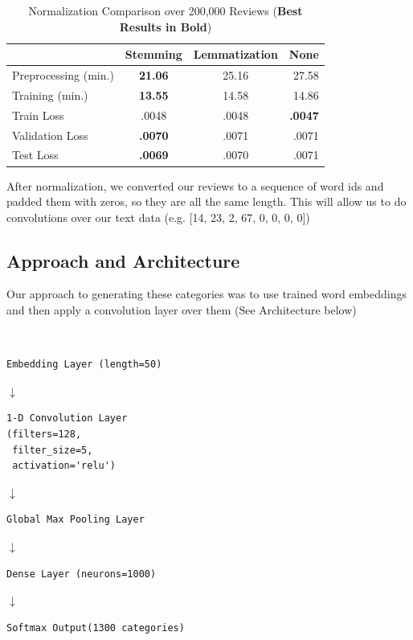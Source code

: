 \documentclass{article}
\begin{document}
\begin{table}[h!]
	\begin{center}
		\caption{Normalization Comparison over 200,000 Reviews (\textbf{Best Results in Bold})}
		\label{tab:table1}
		\begin{tabular}{l||c|c|r} %
			\textbf{} & \textbf{Stemming} & \textbf{Lemmatization} & \textbf{None}\\
			\hline
			Preprocessing (min.) & \textbf{21.06} & 25.16 & 27.58\\
			Training (min.) & \textbf{13.55} & 14.58 & 14.86\\
			Train Loss & .0048 & .0048 & \textbf{.0047}\\
			Validation Loss & \textbf{.0070} & .0071 & .0071\\
			Test Loss & \textbf{.0069} & .0070 & .0071\\
		\end{tabular}
	\end{center}
\end{table}

After normalization, we converted our reviews to a sequence of word ids and padded them with zeros, so they are all the same length. This will allow us to do convolutions over our text data (e.g. [14, 23, 2, 67, 0, 0, 0, 0])

\subsection*{Approach and Architecture}

Our approach to generating these categories was to use trained word embeddings and then apply a convolution layer over them (See Architecture below)

\mbox{}\\
\begin{verbatim}
Embedding Layer (length=50)
\end{verbatim}
$\downarrow$
\begin{verbatim}
1-D Convolution Layer
(filters=128,
 filter_size=5,
 activation='relu')
\end{verbatim}
$\downarrow$
\begin{verbatim}
Global Max Pooling Layer
\end{verbatim}
$\downarrow$
\begin{verbatim}
Dense Layer (neurons=1000)
\end{verbatim}
$\downarrow$
\begin{verbatim}
Softmax Output(1300 categories)
\end{verbatim}
\mbox{}\\
\end{document}
